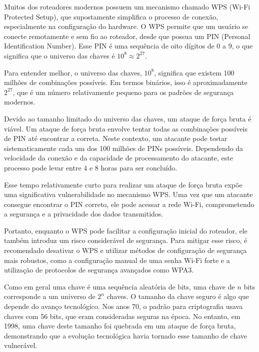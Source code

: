 \begin{example}
  Muitos dos roteadores modernos possuem um mecanismo chamado WPS (Wi-Fi Protected Setup), que supostamente simplifica o processo de conexão, especialmente na configuração do hardware.
  O WPS permite que um usuário se conecte remotamente e sem fio ao roteador, desde que possua um PIN (Personal Identification Number).
  Esse PIN é uma sequência de oito dígitos de 0 a 9, o que significa que o universo das chaves é $10^8 \approx 2^{27}$.

  Para entender melhor, o universo das chaves, $10^8$, significa que existem 100 milhões de combinações possíveis.
  Em termos binários, isso é aproximadamente $2^{27}$, que é um número relativamente pequeno para os padrões de segurança modernos.

  Devido ao tamanho limitado do universo das chaves, um ataque de força bruta é viável.
  Um ataque de força bruta envolve tentar todas as combinações possíveis de PIN até encontrar a correta.
  Neste contexto, um atacante pode testar sistematicamente cada um dos 100 milhões de PINs possíveis.
  Dependendo da velocidade da conexão e da capacidade de processamento do atacante, este processo pode levar entre 4 e 8 horas para ser concluído.

  Esse tempo relativamente curto para realizar um ataque de força bruta expõe uma significativa vulnerabilidade no mecanismo WPS.
  Uma vez que um atacante consegue encontrar o PIN correto, ele pode acessar a rede Wi-Fi, comprometendo a segurança e a privacidade dos dados transmitidos.

  Portanto, enquanto o WPS pode facilitar a configuração inicial do roteador, ele também introduz um risco considerável de segurança.
  Para mitigar esse risco, é recomendado desativar o WPS e utilizar métodos de configuração de segurança mais robustos, como a configuração manual de uma senha Wi-Fi forte e a utilização de protocolos de segurança avançados como WPA3.
\end{example}

Como em geral uma chave é uma sequência aleatória de bits, uma chave de $n$ bits corresponde a um universo de $2^n$ chaves.
O tamanho da chave seguro é algo que depende do avanço tecnológico.
Nos anos 70, o padrão para criptografia usava chaves com 56 bits, que eram consideradas seguras na época.
No entanto, em 1998, uma chave deste tamanho foi quebrada em um ataque de força bruta, demonstrando que a evolução tecnológica havia tornado esse tamanho de chave vulnerável.

